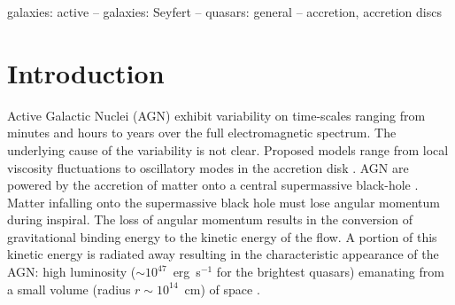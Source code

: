 \documentclass[a4paper,fleqn,usenatbib]{mnras}
\begin{document}
\begin{keywords}
galaxies: active -- galaxies: Seyfert -- quasars: general -- accretion, accretion discs
\end{keywords}



\section[Introduction]{Introduction}\label{sec:Introduction}

Active Galactic Nuclei (AGN) exhibit variability on time-scales ranging from minutes and hours to years over the full electromagnetic spectrum. The underlying cause of the variability is not clear. Proposed models range from local viscosity fluctuations to oscillatory modes in the accretion disk \citep{UrryARAA}. AGN are powered by the accretion of matter onto a central supermassive black-hole \citep{ReesARAA}. Matter infalling onto the supermassive black hole must lose angular momentum during inspiral. The loss of angular momentum results in the conversion of gravitational binding energy to the kinetic energy of the flow. A portion of this kinetic energy is radiated away resulting in the characteristic appearance of the AGN: high luminosity ($\sim 10^{47}$~erg~s$^{-1}$ for the brightest quasars) emanating from a small volume (radius $r \sim 10^{14}$~cm) of space \citep{Edelson96}.
\end{document}
